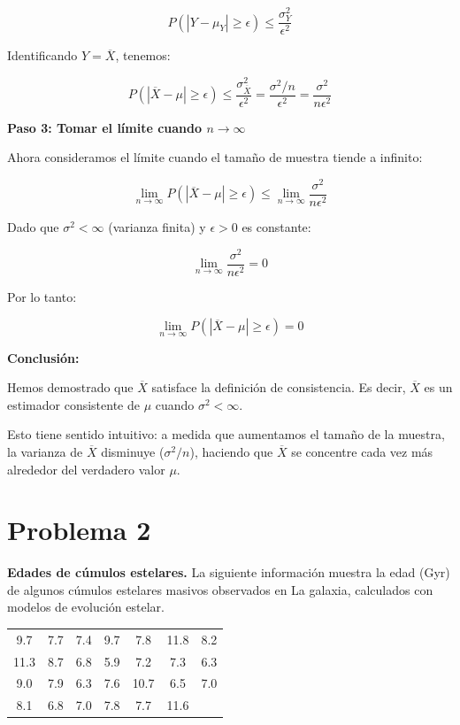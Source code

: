 \documentclass[12pt]{article}
\begin{document}
$$P(|Y - \mu_Y| \geq \epsilon) \leq \frac{\sigma^2_Y}{\epsilon^2}$$

Identificando $Y = \overline{X}$, tenemos:

$$P(|\overline{X} - \mu| \geq \epsilon) \leq \frac{\sigma^2_{\overline{X}}}{\epsilon^2} = \frac{\sigma^2/n}{\epsilon^2} = \frac{\sigma^2}{n\epsilon^2}$$

\textbf{Paso 3: Tomar el límite cuando $n \to \infty$}

Ahora consideramos el límite cuando el tamaño de muestra tiende a infinito:

$$\lim_{n \to \infty} P(|\overline{X} - \mu| \geq \epsilon) \leq \lim_{n \to \infty} \frac{\sigma^2}{n\epsilon^2}$$

Dado que $\sigma^2 < \infty$ (varianza finita) y $\epsilon > 0$ es constante:

$$\lim_{n \to \infty} \frac{\sigma^2}{n\epsilon^2} = 0$$

Por lo tanto:

$$\lim_{n \to \infty} P(|\overline{X} - \mu| \geq \epsilon) = 0$$

\textbf{Conclusión:}

Hemos demostrado que $\overline{X}$ satisface la definición de consistencia. Es decir, $\overline{X}$ es un estimador consistente de $\mu$ cuando $\sigma^2 < \infty$.

Esto tiene sentido intuitivo: a medida que aumentamos el tamaño de la muestra, la varianza de $\overline{X}$ disminuye ($\sigma^2/n$), haciendo que $\overline{X}$ se concentre cada vez más alrededor del verdadero valor $\mu$.

\section{Problema 2}

\textbf{Edades de cúmulos estelares.} La siguiente información muestra la edad (Gyr) de algunos cúmulos estelares masivos observados en La galaxia, calculados con modelos de evolución estelar.

\begin{center}
    \begin{tabular}{ccccccc}
    9.7 & 7.7 & 7.4 & 9.7 & 7.8 & 11.8 & 8.2 \\
    11.3 & 8.7 & 6.8 & 5.9 & 7.2 & 7.3 & 6.3 \\
    9.0 & 7.9 & 6.3 & 7.6 & 10.7 & 6.5 & 7.0 \\
    8.1 & 6.8 & 7.0 & 7.8 & 7.7 & 11.6 & \\
    \end{tabular}
\end{center}
\end{document}
